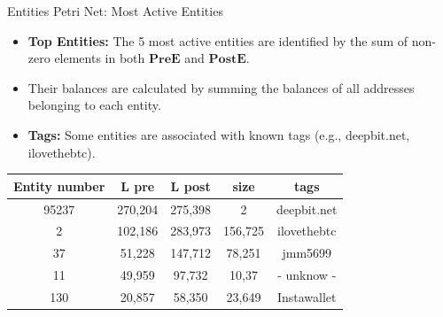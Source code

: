 \documentclass{beamer}
\begin{document}
\begin{frame}{Entities Petri Net: Most Active Entities}
    \footnotesize
    \begin{itemize}
        \item \textbf{Top Entities:} The 5 most active entities are identified by the sum of non-zero elements in both $\mathbf{PreE}$ and $\mathbf{PostE}$.
        \item Their balances are calculated by summing the balances of all addresses belonging to each entity.
        \item \textbf{Tags:} Some entities are associated with known tags (e.g., deepbit.net, ilovethebtc).
    \end{itemize}
    \vspace{-0.2cm}
    \begin{center}
        {\begin{tabular}{ccccc} %
                \hline
                Entity number & L pre   & L post  & size    & tags        \\ \hline
                95237         & 270,204 & 275,398 & 2       & deepbit.net \\
                2             & 102,186 & 283,973 & 156,725 & ilovethebtc \\
                37            & 51,228  & 147,712 & 78,251  & jmm5699     \\
                11            & 49,959  & 97,732  & 10,37   & - unknow -  \\
                130           & 20,857  & 58,350  & 23,649  & Instawallet \\
                \hline
            \end{tabular}}
        \vspace{.2cm}
        \label{tab_10Entity_1}
    \end{center}
\end{frame}
\end{document}

